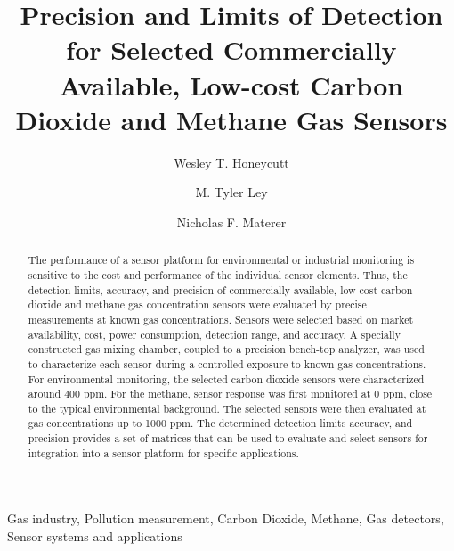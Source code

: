 \documentclass[preprint,sort&compress]{elsarticle}
\begin{document}
	
	\begin{frontmatter}
		\title{Precision and Limits of Detection for Selected Commercially Available, Low-cost Carbon Dioxide and Methane Gas Sensors}
		\author[chm]{Wesley T. Honeycutt}
		
		\author[cve]{M. Tyler Ley}	
		
		\author[chm]{Nicholas F. Materer}
		
		\address[chm]{Oklahoma State University, Department of Chemistry, 107 Physical Sciences, Stillwater, OK 74078, USA}
		\address[cve]{Oklahoma State University, Department of Civil Engineering, 319C Engineering South, Stillwater, OK 74078, USA}
		
		\begin{abstract} 
			
			The performance of a sensor platform for environmental or industrial monitoring is sensitive to the cost and performance of the individual sensor elements.  Thus, the detection limits, accuracy, and precision of commercially available, low-cost carbon dioxide and methane gas concentration sensors were evaluated by precise measurements at known gas concentrations.  Sensors were selected based on market availability, cost, power consumption, detection range, and accuracy.  A specially constructed gas mixing chamber, coupled to a precision bench-top analyzer, was used to characterize each sensor during a controlled exposure to known gas concentrations.  For environmental monitoring, the selected carbon dioxide sensors were characterized around 400 ppm.  For the methane, sensor response was first monitored at 0 ppm, close to the typical environmental background.  The selected sensors were then evaluated at gas concentrations up to 1000 ppm.  The determined detection limits accuracy, and precision provides a set of matrices that can be used to evaluate and select sensors for integration into a sensor platform for specific applications.  
			
		\end{abstract}
		
		\begin{keyword}
			Gas industry, Pollution measurement, Carbon Dioxide, Methane, Gas detectors, Sensor systems and applications
		\end{keyword}
		
	\end{frontmatter}
	
\end{document}
